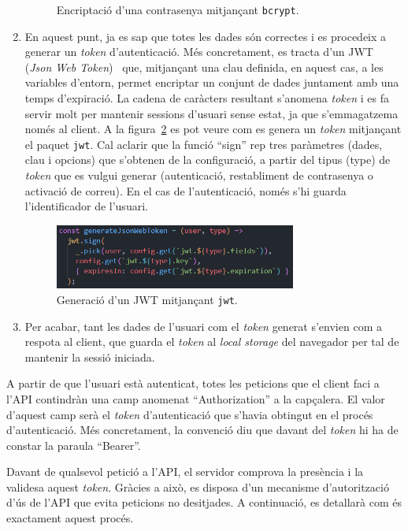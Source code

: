 \documentclass[a4paper,12pt]{ThesisStyle}
\begin{document}
\begin{enumerate}
\begin{figure}[H]
    \caption{\label{img:encriptacioContrasenya}Encriptació d'una contrasenya mitjançant \texttt{bcrypt}.}
  \end{figure}
  \item En aquest punt, ja es sap que totes les dades són correctes i es procedeix a generar un \textit{token} d'autenticació. Més concretament, es tracta d'un JWT (\textit{Json Web Token})~\cite{JWT} que, mitjançant una clau definida, en aquest cas, a les variables d'entorn, permet encriptar un conjunt de dades juntament amb una temps d'expiració. La cadena de caràcters resultant s'anomena \textit{token} i es fa servir molt per mantenir sessions d'usuari sense estat, ja que s'emmagatzema només al client. A la figura~\ref{img:generacioToken} es pot veure com es genera un \textit{token} mitjançant el paquet \texttt{jwt}. Cal aclarir que la funció ``sign'' rep tres paràmetres (dades, clau i opcions) que s'obtenen de la configuració, a partir del tipus (type) de \textit{token} que es vulgui generar (autenticació, restabliment de contrasenya o activació de correu). En el cas de l'autenticació, només s'hi guarda l'identificador de l'usuari.
  \begin{figure}[H]
    \centering
    \includegraphics[width=0.75\textwidth]{assets/code/seguretat/generacioToken.png}
    \caption{\label{img:generacioToken}Generació d'un JWT mitjançant \texttt{jwt}.}
  \end{figure}
  \item Per acabar, tant les dades de l'usuari com el \textit{token} generat s'envien com a respota al client, que guarda el \textit{token} al \textit{local storage} del navegador per tal de mantenir la sessió iniciada.
\end{enumerate}

A partir de que l'usuari està autenticat, totes les peticions que el client faci a l'API contindràn una camp anomenat ``Authorization'' a la capçalera. El valor d'aquest camp serà el \textit{token} d'autenticació que s'havia obtingut en el procés d'autenticació. Més concretament, la convenció diu que davant del \textit{token} hi ha de constar la paraula ``Bearer''.

Davant de qualsevol petició a l'API, el servidor comprova la presència i la validesa aquest \textit{token}. Gràcies a això, es disposa d'un mecanisme d'autorització d'ús de l'API que evita peticions no desitjades. A continuació, es detallarà com és exactament aquest procés.
\end{document}
